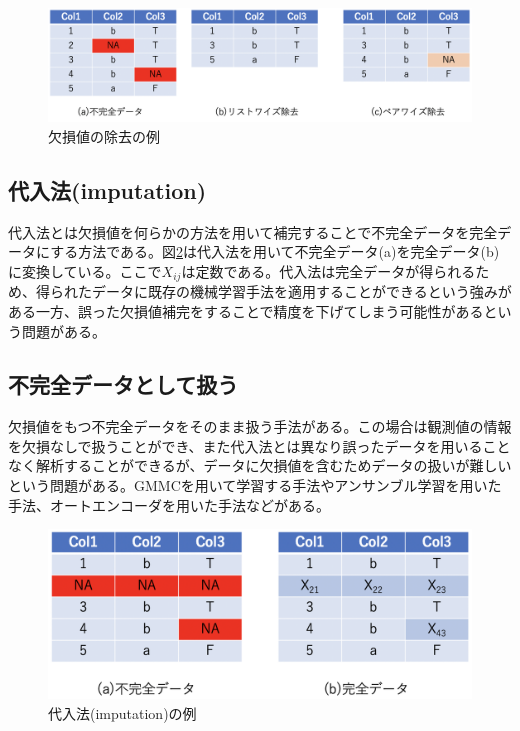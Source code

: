 \begin{figure}[tb]
  \centering
  \includegraphics[width=1\hsize]{figures/missing_delete.png}
  \caption{欠損値の除去の例}
  \label{fig:missing_delete}
\end{figure}

\subsection{代入法(imputation)}
代入法とは欠損値を何らかの方法を用いて補完することで不完全データを完全データにする方法である。図\ref{fig:missing_imputation}は代入法を用いて不完全データ(a)を完全データ(b)に変換している。ここで$X_{ij}$は定数である。代入法は完全データが得られるため、得られたデータに既存の機械学習手法を適用することができるという強みがある一方、誤った欠損値補完をすることで精度を下げてしまう可能性があるという問題がある。

\subsection{不完全データとして扱う}
欠損値をもつ不完全データをそのまま扱う手法がある。この場合は観測値の情報を欠損なしで扱うことができ、また代入法とは異なり誤ったデータを用いることなく解析することができるが、データに欠損値を含むためデータの扱いが難しいという問題がある。GMMC\cite{smieja2018GMMC}を用いて学習する手法\cite{taguchi2021graph}やアンサンブル学習を用いた手法\cite{jiang2005ensemble}、オートエンコーダを用いた手法\cite{Smieja2019}などがある。

\begin{figure}[tb]
  \centering
  \includegraphics[width=0.7\hsize]{figures/missing_imputation.png}
  \caption{代入法(imputation)の例}
  \label{fig:missing_imputation}
\end{figure}


